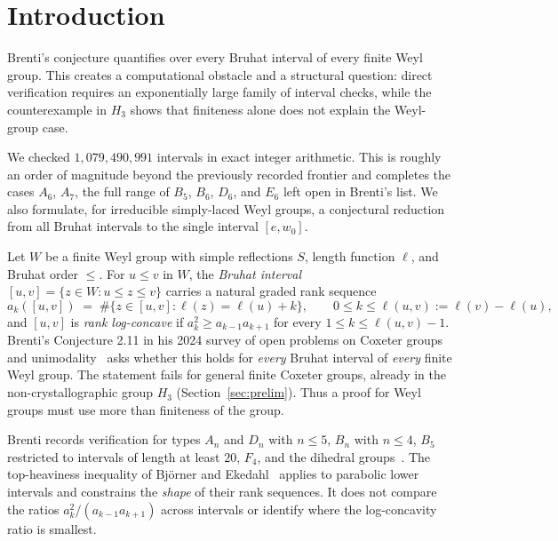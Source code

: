 \documentclass[11pt]{amsart}
\theoremstyle{plain}
\theoremstyle{definition}
\theoremstyle{remark}
\newcommand{\W}{W}
\begin{document}

\maketitle

\section{Introduction}
\label{sec:intro}

Brenti's conjecture quantifies over every Bruhat interval of every finite
Weyl group. This creates a computational obstacle and a structural
question: direct verification requires an exponentially large family of
interval checks, while the counterexample in $H_3$ shows that finiteness
alone does not explain the Weyl-group case.

We checked $1{,}079{,}490{,}991$ intervals in exact integer arithmetic.
This is roughly an order of magnitude beyond the previously recorded
frontier and completes the cases $A_6$, $A_7$, the full range of $B_5$,
$B_6$, $D_6$, and $E_6$ left open in Brenti's list. We also formulate, for
irreducible simply-laced Weyl groups, a conjectural reduction from all
Bruhat intervals to the single interval $[e,w_0]$.

Let $\W$ be a finite Weyl group with simple reflections $S$, length function
$\ell$, and Bruhat order $\le$. For $u\le v$ in $\W$, the \emph{Bruhat
interval} $[u,v]=\{z\in \W : u\le z\le v\}$ carries a natural graded rank
sequence
\[
a_k([u,v]) \;=\; \#\{z\in[u,v] : \ell(z)=\ell(u)+k\}, \qquad 0\le k\le
\ell(u,v):=\ell(v)-\ell(u),
\]
and $[u,v]$ is \emph{rank log-concave} if $a_k^2\ge a_{k-1}a_{k+1}$ for every
$1\le k\le \ell(u,v)-1$. Brenti's Conjecture 2.11 in his 2024 survey of open problems on Coxeter
groups and unimodality~\cite{brenti2024open} asks whether this holds for
\emph{every} Bruhat interval of \emph{every} finite Weyl group. The
statement fails for general finite Coxeter groups, already in the
non-crystallographic group $H_3$ (Section~\ref{sec:prelim}). Thus a proof
for Weyl groups must use more than finiteness of the group.

Brenti records verification for types $A_n$ and $D_n$ with $n\le 5$,
$B_n$ with $n\le 4$, $B_5$ restricted to intervals of length at least
$20$, $F_4$, and the dihedral groups~\cite{brenti2024open}. The
top-heaviness inequality of Bj\"orner and
Ekedahl~\cite{bjorner-ekedahl} applies to parabolic lower intervals and
constrains the \emph{shape} of their rank sequences. It does not compare
the ratios $a_k^2/(a_{k-1}a_{k+1})$ across intervals or identify where the
log-concavity ratio is smallest.
\end{document}

